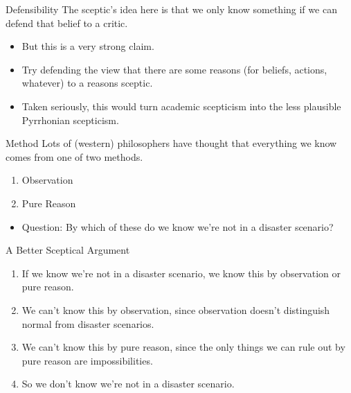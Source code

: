 \documentclass[
  17pt,
  letterpaper,
  ignorenonframetext,
  aspectratio=169,
]{beamer}
\providecommand{\tightlist}{%
  \setlength{\itemsep}{0pt}\setlength{\parskip}{0pt}}\usepackage{longtable,booktabs,array}
\begin{document}
\begin{frame}{Defensibility}
\protect\hypertarget{defensibility}{}
The sceptic's idea here is that we only know something if we can defend
that belief to a critic.

\begin{itemize}[<+->]
\tightlist
\item
  But this is a very strong claim.
\item
  Try defending the view that there are some reasons (for beliefs,
  actions, whatever) to a reasons sceptic.
\item
  Taken seriously, this would turn academic scepticism into the less
  plausible Pyrrhonian scepticism.
\end{itemize}
\end{frame}

\begin{frame}{Method}
\protect\hypertarget{method}{}
Lots of (western) philosophers have thought that everything we know
comes from one of two methods.

\begin{enumerate}[<+->]
\tightlist
\item
  Observation
\item
  Pure Reason
\end{enumerate}

\begin{itemize}[<+->]
\tightlist
\item
  Question: By which of these do we know we're not in a disaster
  scenario?
\end{itemize}
\end{frame}

\begin{frame}{A Better Sceptical Argument}
\protect\hypertarget{a-better-sceptical-argument}{}
\begin{enumerate}[<+->]
\tightlist
\item
  If we know we're not in a disaster scenario, we know this by
  observation or pure reason.
\item
  We can't know this by observation, since observation doesn't
  distinguish normal from disaster scenarios.
\item
  We can't know this by pure reason, since the only things we can rule
  out by pure reason are impossibilities.
\item
  So we don't know we're not in a disaster scenario.
\end{enumerate}
\end{frame}
\end{document}
